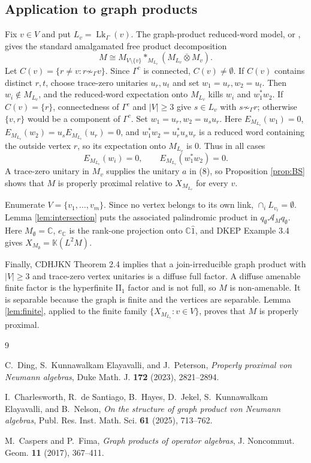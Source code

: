 \documentclass[12pt]{article}
\DeclareMathOperator{\Lk}{Lk}
\newcommand{\bbarotimes}{\mathbin{\overline{\otimes}}}
\newcommand{\cA}{\mathcal A}
\newcommand{\C}{\mathbb C}
\begin{document}
\subsection*{Application to graph products}

Fix \(v\in V\) and put \(L_v=\Lk_\Gamma(v)\).  The graph-product reduced-word
model, or \cite{CF17}, gives the standard amalgamated free product
decomposition
\[
        M\cong M_{V\setminus\{v\}}*_{M_{L_v}}
        (M_{L_v}\bbarotimes M_v).                                \tag{8}
\]
Let \(C(v)=\{r\ne v:r\not\sim_\Gamma v\}\).  Since \(\Gamma^c\) is connected,
\(C(v)\ne\emptyset\).  If \(C(v)\) contains distinct \(r,t\), choose trace-zero
unitaries \(u_r,u_t\) and set \(w_1=u_r,w_2=u_t\).  Then \(w_i\notin M_{L_v}\),
and the reduced-word expectation onto \(M_{L_v}\) kills \(w_i\) and
\(w_1^*w_2\).  If \(C(v)=\{r\}\), connectedness of \(\Gamma^c\) and
\(|V|\ge3\) give \(s\in L_v\) with \(s\not\sim_\Gamma r\); otherwise
\(\{v,r\}\) would be a component of \(\Gamma^c\).  Set
\(w_1=u_r,w_2=u_su_r\).  Here \(E_{M_{L_v}}(w_1)=0\),
\(E_{M_{L_v}}(w_2)=u_sE_{M_{L_v}}(u_r)=0\), and
\(w_1^*w_2=u_r^*u_su_r\) is a reduced word containing the outside vertex \(r\),
so its expectation onto \(M_{L_v}\) is \(0\).  Thus in all cases
\[
        E_{M_{L_v}}(w_i)=0,\qquad E_{M_{L_v}}(w_1^*w_2)=0 .
\]
A trace-zero unitary in \(M_v\) supplies the unitary \(a\) in (8), so
Proposition \ref{prop:BS} shows that \(M\) is properly proximal relative to
\(X_{M_{L_v}}\) for every \(v\).

Enumerate \(V=\{v_1,\ldots,v_m\}\).  Since no vertex belongs to its own link,
\(\cap_i L_{v_i}=\emptyset\).  Lemma \ref{lem:intersection} puts the associated
palindromic product in \(q_\emptyset\cA_Mq_\emptyset\).  Here
\(M_\emptyset=\C\), \(e_\C\) is the rank-one projection onto
\(\C\widehat1\), and DKEP Example 3.4 gives
\(X_{M_\emptyset}=\mathbb K(L^2M)\).

Finally, CDHJKN Theorem 2.4 implies that a join-irreducible graph product with
\(|V|\ge3\) and trace-zero vertex unitaries is a diffuse full factor.  A
diffuse amenable finite factor is the hyperfinite II\(_1\) factor and is not
full, so \(M\) is non-amenable.  It is separable because the graph is finite
and the vertices are separable.  Lemma \ref{lem:finite}, applied to the finite
family \(\{X_{M_{L_v}}:v\in V\}\), proves that \(M\) is properly proximal.

\begin{thebibliography}{9}

C.~Ding, S.~Kunnawalkam Elayavalli, and J.~Peterson,
\emph{Properly proximal von Neumann algebras},
Duke Math. J. \textbf{172} (2023), 2821--2894.

I.~Charlesworth, R.~de Santiago, B.~Hayes, D.~Jekel,
S.~Kunnawalkam Elayavalli, and B.~Nelson,
\emph{On the structure of graph product von Neumann algebras},
Publ. Res. Inst. Math. Sci. \textbf{61} (2025), 713--762.

M.~Caspers and P.~Fima,
\emph{Graph products of operator algebras},
J. Noncommut. Geom. \textbf{11} (2017), 367--411.

\end{thebibliography}
\end{document}
